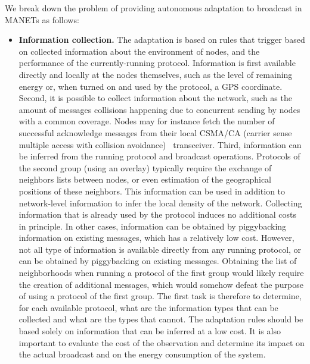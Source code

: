 We break down the problem of providing autonomous adaptation to broadcast in MANETs as follows:
\begin{itemize}
	\item \textbf{Information collection.}
	The adaptation is based on rules that trigger based on collected information about the environment of nodes, and the performance of the currently-running protocol.
	Information is first available directly and locally at the nodes themselves, such as the level of remaining energy or, when turned on and used by the protocol, a GPS coordinate.
	Second, it is possible to collect information about the network, such as the amount of messages collisions happening due to concurrent sending by nodes with a common coverage.
	Nodes may for instance fetch the number of successful acknowledge messages from their local CSMA/CA (carrier sense multiple access with collision avoidance)~\cite{ieee1997wireless} transceiver.
	Third, information can be inferred from the running protocol and broadcast operations.
	Protocols of the second group (using an overlay) typically require the exchange of neighbors lists between nodes, or even estimation of the geographical positions of these neighbors.
	This information can be used in addition to network-level information to infer the local density of the network.
	Collecting information that is already used by the protocol induces no additional costs in principle.
	In other cases, information can be obtained by piggybacking information on existing messages, which has a relatively low cost.
	However, not all type of information is available directly from any running protocol, or can be obtained by piggybacking on existing messages.
	Obtaining the list of neighborhoods when running a protocol of the first group would likely require the creation of additional messages, which would somehow defeat the purpose of using a protocol of the first group.
	The first task is therefore to determine, for each available protocol, what are the information types that can be collected and what are the types that cannot.
	The adaptation rules should be based solely on information that can be inferred at a low cost.
	It is also important to evaluate the cost of the observation and determine its impact on the actual broadcast and on the energy consumption of the system.
		

\end{itemize}

